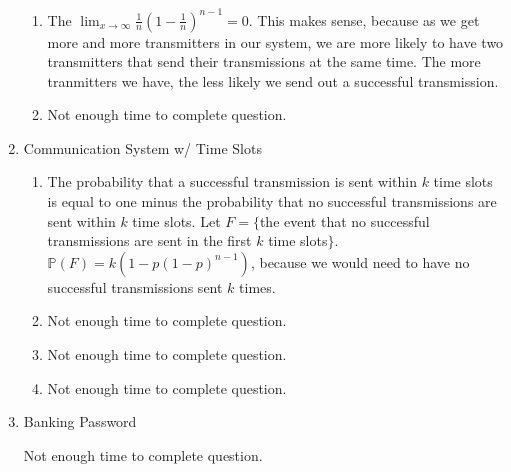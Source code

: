 \documentclass{article}
\begin{document}
\begin{enumerate}[itemsep=12pt]
\begin{enumerate}
  \item
    The $\lim_{x \to \infty} \frac{1}{n} (1 - \frac{1}{n})^{n - 1} = 0$. This makes sense, because
    as we get more and more transmitters in our system, we are more likely to have two transmitters
    that send their transmissions at the same time. The more tranmitters we have, the less likely we
    send out a successful transmission.

  \item
    Not enough time to complete question.
  \end{enumerate}


\item
  Communication System w/ Time Slots

  \begin{enumerate}
  \item
    The probability that a successful transmission is sent within $k$ time slots is equal to one
    minus the probability that no successful transmissions are sent within $k$ time slots. Let $F =
    \{$the event that no successful transmissions are sent in the first $k$ time
      slots$\}$. $\mathbb{P} (F) = k (1 - p (1 - p)^{n - 1})$, because we would need to have no
    successful transmissions sent $k$ times.

  \item
    Not enough time to complete question.

  \item
    Not enough time to complete question.

  \item
    Not enough time to complete question.
  \end{enumerate}

\item
  Banking Password

  Not enough time to complete question.
  
  
\end{enumerate}
\end{document}

